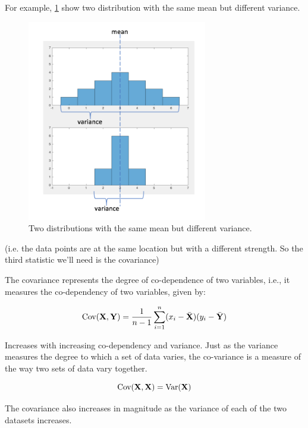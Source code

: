 \documentclass[11pt, oneside]{article}   	%
\begin{document}
For example, \ref{fig:MeanVariance} show two distribution with the same mean but different variance. 

\begin{figure}[!h]
	\centering
	\includegraphics[width=0.7\textwidth]{same-mean_different-variance}
	\caption{Two distributions with the same mean but different variance.}
	\label{fig:MeanVariance}
\end{figure}


(i.e. the data points are at the same location but with a different strength. So the third statistic we'll need is the covariance)

The covariance represents the degree of co-dependence of two variables, i.e., it measures the co-dependency of two variables, given by:

\begin{equation}
   \text{Cov} ({\bf X}, {\bf Y}) = \frac{1}{n-1} \sum_{i=1}^{n} (x_i - \bar{ {\bf X}}) (y_i - \bar{ {\bf Y}})
\end{equation}

Increases with increasing co-dependency and variance. Just as the variance measures the degree to which a set of data varies, the co-variance is a measure of the way two sets of data vary together.

\begin{equation}
   \text{Cov} ({\bf X}, {\bf X}) = \text{Var}({\bf X})
\end{equation}

The covariance also increases in magnitude as the variance of each of the two datasets increases.
\end{document}
